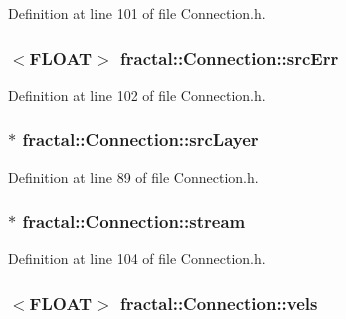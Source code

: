 Definition at line 101 of file Connection.\+h.

\hypertarget{classfractal_1_1Connection_abc00863a5dc0e43990ace905ed7f50c0}{
\subsubsection[{src\+Err}]{$<${\bf F\+L\+O\+A\+T}$>$ fractal\+::\+Connection\+::src\+Err\hspace{0.3cm}{\ttfamily [protected]}}}\label{classfractal_1_1Connection_abc00863a5dc0e43990ace905ed7f50c0}


Definition at line 102 of file Connection.\+h.

\hypertarget{classfractal_1_1Connection_a79a17a00d69083b24cd9ebcb11555952}{
\subsubsection[{src\+Layer}]{$\ast$ fractal\+::\+Connection\+::src\+Layer\hspace{0.3cm}{\ttfamily [protected]}}}\label{classfractal_1_1Connection_a79a17a00d69083b24cd9ebcb11555952}


Definition at line 89 of file Connection.\+h.

\hypertarget{classfractal_1_1Connection_afd1476955597e7a1fddb196fec69af82}{
\subsubsection[{stream}]{$\ast$ fractal\+::\+Connection\+::stream\hspace{0.3cm}{\ttfamily [protected]}}}\label{classfractal_1_1Connection_afd1476955597e7a1fddb196fec69af82}


Definition at line 104 of file Connection.\+h.

\hypertarget{classfractal_1_1Connection_ae56d3a80cde5f872b18e11a9e087a335}{
\subsubsection[{vels}]{$<${\bf F\+L\+O\+A\+T}$>$ fractal\+::\+Connection\+::vels\hspace{0.3cm}{\ttfamily [protected]}}}\label{classfractal_1_1Connection_ae56d3a80cde5f872b18e11a9e087a335}


